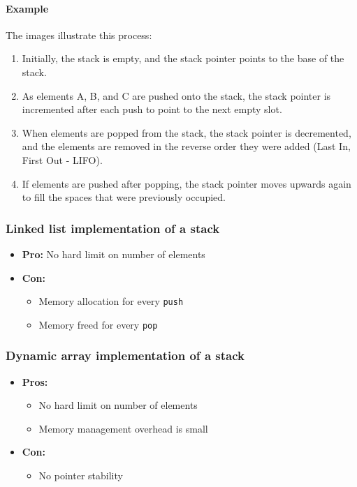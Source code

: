 \documentclass[12pt]{article}
\begin{document}
\paragraph{Example}

The images illustrate this process:
\begin{enumerate}
    \item Initially, the stack is empty, and the stack pointer points to the base of the stack.

    \item As elements A, B, and C are pushed onto the stack, the stack pointer is incremented after each push to point to the next empty slot.

    \item When elements are popped from the stack, the stack pointer is decremented, and the elements are removed in the reverse order they were added (Last In, First Out - LIFO).

    \item If elements are pushed after popping, the stack pointer moves upwards again to fill the spaces that were previously occupied.
\end{enumerate}

\subsubsection{Linked list implementation of a stack}
\begin{itemize}
    \item \textbf{Pro:} No hard limit on number of elements
    \item \textbf{Con:}
    \begin{itemize}
        \item Memory allocation for every \texttt{push}
        \item Memory freed for every \texttt{pop}
    \end{itemize}
\end{itemize}
\subsubsection{Dynamic array implementation of a stack}

\begin{itemize}
    \item \textbf{Pros:}
    \begin{itemize}
        \item No hard limit on number of elements
        \item Memory management overhead is small
    \end{itemize}
    \item \textbf{Con:}
    \begin{itemize}
        \item No pointer stability
    \end{itemize}
\end{itemize}
\end{document}
